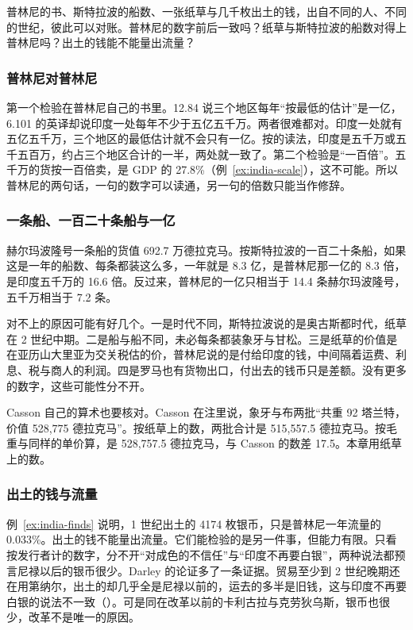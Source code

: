 普林尼的书、斯特拉波的船数、一张纸草与几千枚出土的钱，出自不同的人、不同的世纪，彼此可以对账。普林尼的数字前后一致吗？纸草与斯特拉波的船数对得上普林尼吗？出土的钱能不能量出流量？

\subsubsection{普林尼对普林尼}
第一个检验在普林尼自己的书里。12.84 说三个地区每年“按最低的估计”是一亿，6.101 的英译却说印度一处每年不少于五亿五千万。两者很难都对。印度一处就有五亿五千万，三个地区的最低估计就不会只有一亿。按的读法，印度是五千万或五千五百万，约占三个地区合计的一半，两处就一致了。第二个检验是“一百倍”。五千万的货按一百倍卖，是 GDP 的 27.8\%（例~\ref{ex:india-scale}），这不可能。所以普林尼的两句话，一句的数字可以读通，另一句的倍数只能当作修辞。

\subsubsection{一条船、一百二十条船与一亿}
赫尔玛波隆号一条船的货值 692.7 万德拉克马。按斯特拉波的一百二十条船，如果这是一年的船数、每条都装这么多，一年就是 8.3 亿，是普林尼那一亿的 8.3 倍，是印度五千万的 16.6 倍。反过来，普林尼的一亿只相当于 14.4 条赫尔玛波隆号，五千万相当于 7.2 条。

对不上的原因可能有好几个。一是时代不同，斯特拉波说的是奥古斯都时代，纸草在 2 世纪中期。二是船与船不同，未必每条都装象牙与甘松。三是纸草的价值是在亚历山大里亚为交关税估的价，普林尼说的是付给印度的钱，中间隔着运费、利息、税与商人的利润。四是罗马也有货物出口，付出去的钱币只是差额。没有更多的数字，这些可能性分不开。

Casson 自己的算术也要核对。Casson 在注里说，象牙与布两批“共重 92 塔兰特，价值 528,775 德拉克马”\cite{casson1990}。按纸草上的数，两批合计是 515,557.5 德拉克马。按毛重与同样的单价算，是 528,757.5 德拉克马，与 Casson 的数差 17.5。本章用纸草上的数。

\subsubsection{出土的钱与流量}
例~\ref{ex:india-finds} 说明，1 世纪出土的 4174 枚银币，只是普林尼一年流量的 0.033\%。出土的钱不能量出流量。它们能检验的是另一件事，但能力有限。只看按发行者计的数字，分不开“对成色的不信任”与“印度不再要白银”，两种说法都预言尼禄以后的银币很少。Darley 的论证多了一条证据。贸易至少到 2 世纪晚期还在用第纳尔，出土的却几乎全是尼禄以前的，运去的多半是旧钱，这与印度不再要白银的说法不一致（）。可是同在改革以前的卡利古拉与克劳狄乌斯，银币也很少，改革不是唯一的原因。


